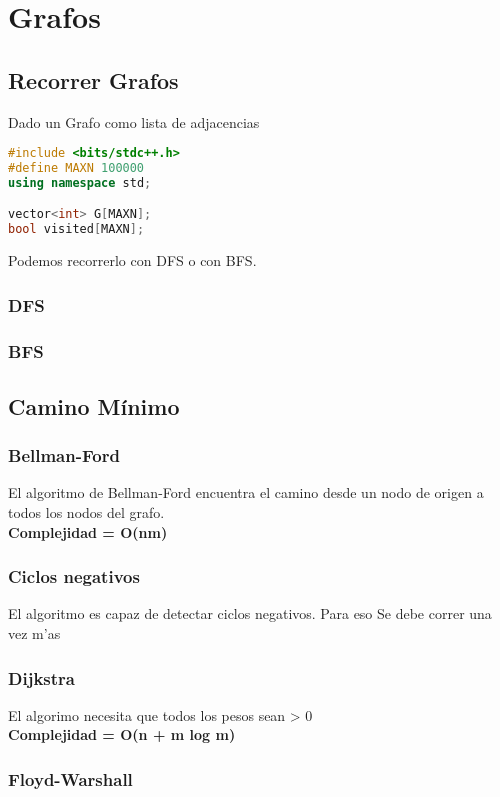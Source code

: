 \newpage
\section{Grafos}

\subsection{Recorrer Grafos}
Dado un Grafo como lista de adjacencias

\begin{lstlisting}[language=C++]
#include <bits/stdc++.h>
#define MAXN 100000
using namespace std;

vector<int> G[MAXN];
bool visited[MAXN];
\end{lstlisting}

Podemos recorrerlo con DFS o con BFS.

\subsubsection{DFS}


\subsubsection{BFS}

\newpage

\subsection{Camino Mínimo}

\subsubsection{Bellman-Ford}
El algoritmo de Bellman-Ford encuentra el camino desde un nodo de origen a todos los nodos del grafo. \\
\textbf{Complejidad = O(nm)}


\subsubsection{Ciclos negativos}
El algoritmo es capaz de detectar ciclos negativos. Para eso Se debe correr una vez m'as
\newpage

\subsubsection{Dijkstra}
El algorimo necesita que todos los pesos sean > 0 \\
\textbf{Complejidad = O(n + m log m)}

\newpage
\subsubsection{Floyd-Warshall}


\newpage
